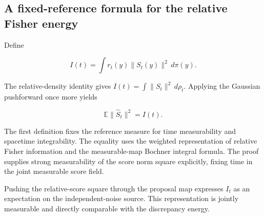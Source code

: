 \documentclass[11pt,a4paper]{report}
\begin{document}
\subsection{\texorpdfstring{A fixed-reference formula for the relative Fisher energy}{A fixed-reference formula for the relative Fisher energy}}
\label{report-step-UnadjustedLangevin-LSI-GaussianEntropyIdentity-lean-17}


Define

\[I(t)=\int r_t(y)\|S_t(y)\|^2\,d\pi(y).\]

The relative-density identity gives \(I(t)=\int\|S_t\|^2\,d\rho_t\). Applying the Gaussian pushforward once more yields

\[\mathbb E\|\widehat S_t\|^2=I(t).\]

The first definition fixes the reference measure for time measurability and spacetime integrability. The equality uses the weighted representation of relative Fisher information and the measurable-map Bochner integral formula. The proof supplies strong measurability of the score norm square explicitly, fixing time in the joint measurable score field.



Pushing the relative-score square through the proposal map expresses \(I_t\) as an expectation on the independent-noise source. This representation is jointly measurable and directly comparable with the discrepancy energy.
\end{document}
